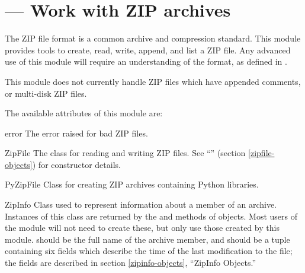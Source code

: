 \section{ ---
         Work with ZIP archives}



The ZIP file format is a common archive and compression standard.
This module provides tools to create, read, write, append, and list a
ZIP file.  Any advanced use of this module will require an
understanding of the format, as defined in
.

This module does not currently handle ZIP files which have appended
comments, or multi-disk ZIP files.

The available attributes of this module are:

\begin{excdesc}{error}
  The error raised for bad ZIP files.
\end{excdesc}

\begin{classdesc*}{ZipFile}
  The class for reading and writing ZIP files.  See
  ``'' (section \ref{zipfile-objects}) for
  constructor details.
\end{classdesc*}

\begin{classdesc*}{PyZipFile}
  Class for creating ZIP archives containing Python libraries.
\end{classdesc*}

\begin{classdesc}{ZipInfo}{}
  Class used to represent information about a member of an archive.
  Instances of this class are returned by the  and
   methods of  objects.  Most users
  of the  module will not need to create these, but
  only use those created by this module.
   should be the full name of the archive member, and
   should be a tuple containing six fields which
  describe the time of the last modification to the file; the fields
  are described in section \ref{zipinfo-objects}, ``ZipInfo Objects.''
\end{classdesc}

